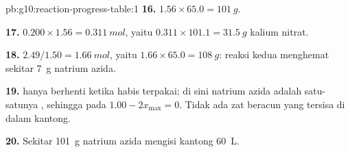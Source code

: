 \begin{solution}{pb:g10:reaction-progress-table:1}
\textbf{16.} $1.56 \times 65.0 = \qty{101}{g}$.

\textbf{17.} $0.200 \times 1.56 = \qty{0.311}{mol}$, yaitu
$0.311 \times 101.1 = \qty{31.5}{g}$ kalium nitrat.

\textbf{18.} $2.49 / 1.50 = \qty{1.66}{mol}$, yaitu
$1.66 \times 65.0 = \qty{108}{g}$: reaksi kedua menghemat sekitar
\qty{7}{g} natrium azida.

\textbf{19.}  hanya berhenti ketika 
habis terpakai; di sini natrium azida adalah satu-satunya ,
sehingga pada   $1.00 - 2x_{\max} = 0$. Tidak
ada zat beracun yang tersisa di dalam kantong.

\textbf{20.} Sekitar \qty{101}{g} natrium azida mengisi kantong 
\qty{60}{L}.
\end{solution}
